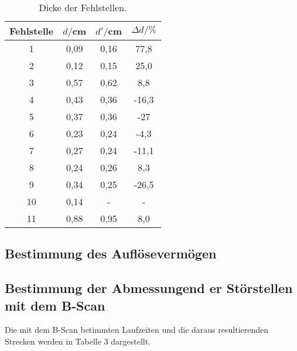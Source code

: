 \begin{table}[H]
  \centering
  \caption{Dicke der Fehlstellen.}
  \label{tab:spannung1}
  \begin{tabular}{c c c c}
    \toprule
  Fehlstelle & $d/$cm & $d'/$cm & $\Delta d/ \%$  \\
    \midrule
    1  &  0,09 & 0,16 & 77,8    \\
    2  &  0,12 & 0,15 & 25,0  \\
    3  &  0,57 & 0,62 & 8,8   \\
    4  &  0,43 & 0,36 & -16,3  \\
    5  &  0,37 & 0,36 & -27   \\
    6  &  0,23 & 0,24 & -4,3   \\
    7  &  0,27 & 0,24 & -11,1   \\
    8  &  0,24 & 0,26 & 8,3   \\
    9  &  0,34 & 0,25 & -26,5   \\
    10 &  0,14 & -    & -    \\
    11 &  0,88 & 0,95 & 8,0   \\
    \bottomrule
  \end{tabular}
\end{table}


\subsection{Bestimmung des Auflösevermögen}



\subsection{Bestimmung der Abmessungend er Störstellen mit dem B-Scan}

Die mit dem B-Scan betimmten Laufzeiten und die daraus resultierenden Strecken werden in Tabelle 3 dargestellt.

